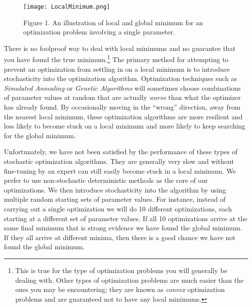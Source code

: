 \documentclass[]{memoir}
\let\Oldincludegraphics\includegraphics
\renewcommand{\includegraphics}[1]{\Oldincludegraphics[max size={\textwidth}{\textheight}]{#1}}
\begin{document}
\begin{figure}[htbp]
\centering
\texttt{[image: LocalMinimum.png]}
\caption{Figure 1. An illustration of local and global minimum for an
optimization problem involving a single parameter.}
\end{figure}

There is no foolproof way to deal with local minimums and no guarantee
that you have found the true minimum.\footnote{This is true for the type
  of optimization problems you will generally be dealing with. Other
  types of optimization problems are much easier than the ones you may
  be encountering; they are known as \emph{convex} optimization problems
  and are guaranteed not to have any local minimums.} The primary method
for attempting to prevent an optimization from settling in on a local
minimum is to introduce stochasticity into the optimization algorithm.
Optimization techniques such as \emph{Simulated Annealing} or
\emph{Genetic Algorithms} will sometimes choose combinations of
parameter values at random that are actually \emph{worse} than what the
optimizer has already found. By occasionally moving in the ``wrong''
direction, away from the nearest local minimum, these optimization
algorithms are more resilient and less likely to become stuck on a local
minimum and more likely to keep searching for the global minimum.

Unfortunately, we have not been satisfied by the performance of these
types of stochastic optimization algorithms. They are generally very
slow and without fine-tuning by an expert can still easily become stuck
in a local minimum. We prefer to use non-stochastic deterministic
methods as the core of our optimizations. We then introduce
stochasticity into the algorithm by using multiple random starting sets
of parameter values. For instance, instead of carrying out a single
optimization we will do 10 different optimizations, each starting at a
different set of parameter values. If all 10 optimizations arrive at the
same final minimum that is strong evidence we have found the global
minimum. If they all arrive at different minima, then there is a good
chance we have not found the global minimum.

\FloatBarrier 
\end{document}
